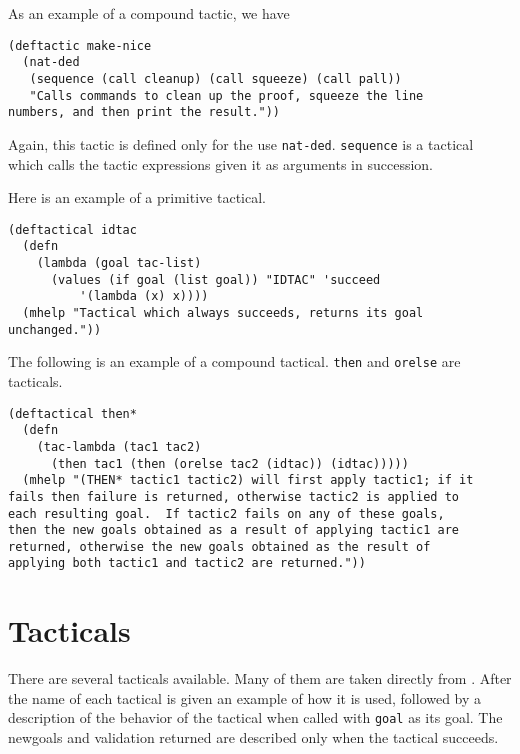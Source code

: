 As an example of a compound tactic, we have
\begin{verbatim}
(deftactic make-nice
  (nat-ded
   (sequence (call cleanup) (call squeeze) (call pall))
   "Calls commands to clean up the proof, squeeze the line 
numbers, and then print the result."))
\end{verbatim}

Again, this tactic is defined only for the use {\tt nat-ded}.  {\tt sequence} is
a tactical which calls the tactic expressions given it as arguments
in succession.

Here is an example of a primitive tactical.
\begin{verbatim}
(deftactical idtac
  (defn
    (lambda (goal tac-list)
      (values (if goal (list goal)) "IDTAC" 'succeed 
	      '(lambda (x) x))))
  (mhelp "Tactical which always succeeds, returns its goal 
unchanged."))
\end{verbatim}

The following is an example of a compound tactical.  {\tt then} and {\tt orelse} are tacticals.

\begin{verbatim}
(deftactical then*
  (defn 
    (tac-lambda (tac1 tac2)
      (then tac1 (then (orelse tac2 (idtac)) (idtac)))))
  (mhelp "(THEN* tactic1 tactic2) will first apply tactic1; if it
fails then failure is returned, otherwise tactic2 is applied to 
each resulting goal.  If tactic2 fails on any of these goals, 
then the new goals obtained as a result of applying tactic1 are 
returned, otherwise the new goals obtained as the result of 
applying both tactic1 and tactic2 are returned."))
\end{verbatim}

\section{Tacticals}
There are several tacticals available.  Many of them are taken directly from
\cite{Gordon79}.  After the name of each tactical is given
an example of how it is used, followed by a description of the behavior
of the tactical
when called with {\tt goal} as its goal.  The newgoals and validation returned
are described only when the tactical succeeds.


